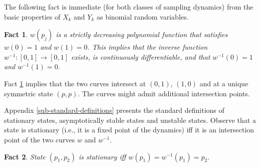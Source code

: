 \documentclass[12pt]{article}
\numberwithin{equation}{section}
\numberwithin{figure}{section}
\theoremstyle{definition}
\theoremstyle{plain}
\theoremstyle{plain}
\theoremstyle{plain}
\theoremstyle{remark}
\theoremstyle{plain}
\theoremstyle{plain}
\newtheorem{fact}{Fact}
\begin{document}
 The following fact is immediate (for both classes of sampling dynamics) from  the basic properties of  $X_k$ and $Y_k$ as binomial random variables.
\begin{fact}\label{fact-w}
$w(p_j)$ is a 
strictly decreasing polynomial function that satisfies $w(0)=1$ and $w(1)=0$.
This implies that the inverse function $w^{-1}:[0,1]\rightarrow[0,1]$ exists, is continuously differentiable, and that $w^{-1}(0)=1$ and $w^{-1}(1)=0.$
\end{fact}
Fact \ref{fact-w} implies that the two curves intersect at $(0,1)$, $(1,0)$ and at a unique symmetric state $(p,p)$. The curves might admit additional intersection points.

Appendix \ref{sub-standard-definitions} presents the standard definitions of  stationary states, asymptotically stable states and unstable states. Observe that a state is stationary
(i.e., it is a fixed point of the dynamics) iff it is an intersection point of the two curves $w$ and $w^{-1}$.

\begin{fact}\label{fact-intersection}
State $(p_1,p_2)$ is stationary iff $w(p_1)=w^{-1}(p_1)=p_2$.
\end{fact}
\end{document}
